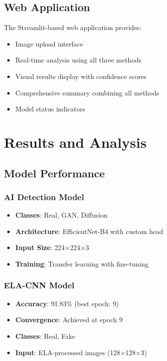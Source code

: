 \documentclass[12pt,a4paper]{article}
\begin{document}
\subsection{Web Application}
The Streamlit-based web application provides:

\begin{itemize}
    \item Image upload interface
    \item Real-time analysis using all three methods
    \item Visual results display with confidence scores
    \item Comprehensive summary combining all methods
    \item Model status indicators
\end{itemize}

\section{Results and Analysis}

\subsection{Model Performance}

\subsubsection{AI Detection Model}
\begin{itemize}
    \item \textbf{Classes}: Real, GAN, Diffusion
    \item \textbf{Architecture}: EfficientNet-B4 with custom head
    \item \textbf{Input Size}: 224×224×3
    \item \textbf{Training}: Transfer learning with fine-tuning
\end{itemize}

\subsubsection{ELA-CNN Model}
\begin{itemize}
    \item \textbf{Accuracy}: 91.83\% (best epoch: 9)
    \item \textbf{Convergence}: Achieved at epoch 9
    \item \textbf{Classes}: Real, Fake
    \item \textbf{Input}: ELA-processed images (128×128×3)
\end{itemize}
\end{document}
